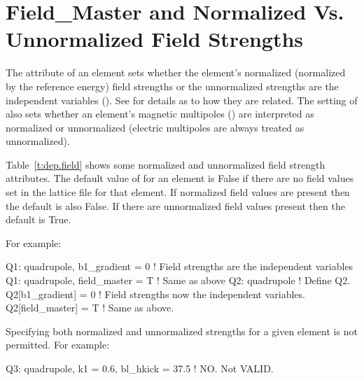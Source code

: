 \section{Field_Master and Normalized Vs. Unnormalized Field Strengths}
\label{s:field.master}

The  attribute of an element sets whether the element's normalized (normalized by
the reference energy) field strengths or the unnormalized strengths are the independent variables
(). See  for details as to how they are related. The setting of
 also sets whether an element's magnetic multipoles () are
interpreted as normalized or unnormalized (electric multipoles are always treated as unnormalized).

Table~\ref{t:dep.field} shows some normalized and unnormalized field strength attributes.  The
default value of  for an element is False if there are no field values set in the
lattice file for that element. If normalized field values are present then the default is also False.
If there are unnormalized field values present then the default is True.

For example:
\begin{example}
  Q1: quadrupole, b1_gradient = 0   ! Field strengths are the independent variables
  Q1: quadrupole, field_master = T  ! Same as above
  Q2: quadrupole        ! Define Q2.
  Q2[b1_gradient] = 0   ! Field strengths now the independent variables.
  Q2[field_master] = T  ! Same as above.
\end{example}

Specifying both normalized and unnormalized strengths for a given element is not
permitted. For example:
\begin{example}
  Q3: quadrupole, k1 = 0.6, bl_hkick = 37.5  ! NO. Not VALID.
\end{example}

